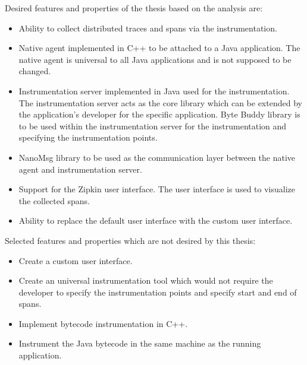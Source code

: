 Desired features and properties of the thesis based on the analysis are:
\begin{itemize}
	\item Ability to collect distributed traces and spans via the instrumentation.
	\item Native agent implemented in C++ to be attached to a Java application. The native agent is universal to all Java applications and is not supposed to be changed.
	\item Instrumentation server implemented in Java used for the instrumentation. The instrumentation server acts as the core library which can be extended by the application's developer for the specific application. Byte Buddy library is to be used within the instrumentation server for the instrumentation and specifying the instrumentation points.
	\item NanoMsg library to be used as the communication layer between the native agent and instrumentation server.
	\item Support for the Zipkin user interface. The user interface is used to visualize the collected spans.
	\item Ability to replace the default user interface with the custom user interface.
\end{itemize}

Selected features and properties which are not desired by this thesis:
\begin{itemize}
	\item Create a custom user interface. 
	\item Create an universal instrumentation tool which would not require the developer to specify the instrumentation points and specify start and end of spans.
	\item Implement bytecode instrumentation in C++.
	\item Instrument the Java bytecode in the same machine as the running application.
\end{itemize}

